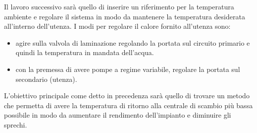 \documentclass[laurea,oneside,11pt]{USiena_tesiLM}
\begin{document}
Il  lavoro successivo sar\`a  quello di inserire un riferimento per la temperatura ambiente e regolare il sistema in modo da mantenere la temperatura desiderata all'interno dell'utenza.
I modi per regolare il calore fornito all'utenza sono:
\begin{itemize}
\item agire sulla valvola di laminazione regolando la portata sul circuito primario e quindi la temperatura in mandata dell'acqua.
\item con la premessa di avere pompe a regime variabile, regolare la portata sul secondario (utenza).
\end{itemize}
L'obiettivo principale come detto in precedenza sarà  quello di trovare un metodo che permetta di avere la temperatura di ritorno alla centrale di scambio pi\`u  bassa possibile in modo da aumentare il rendimento dell'impianto e diminuire gli sprechi.\\

%
%
\end{document}
